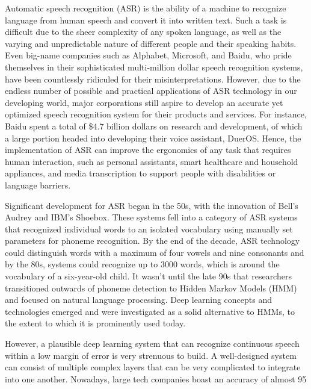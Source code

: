Automatic speech recognition (ASR) is the ability of a machine to recognize language from human speech and convert it into written text. Such a task is difficult due to the sheer complexity of any spoken language, as well as the varying and unpredictable nature of different people and their speaking habits. Even big-name companies such as Alphabet, Microsoft, and Baidu, who pride themselves in their sophisticated multi-million dollar speech recognition systems, have been countlessly ridiculed for their misinterpretations. However, due to the endless number of possible and practical applications of ASR technology in our developing world, major corporations still aspire to develop an accurate yet optimized speech recognition system for their products and services. For instance, Baidu spent a total of \$4.7 billion dollars on research and development, of which a large portion headed into developing their voice assistant, DuerOS. Hence, the implementation of ASR can improve the ergonomics of any task that requires human interaction, such as personal assistants, smart healthcare and household appliances, and media transcription to support people with disabilities or language barriers. 
\par
Significant development for ASR began in the 50s, with the innovation of Bell’s Audrey and IBM’s Shoebox. These systems fell into a category of ASR systems that recognized individual words to an isolated vocabulary using manually set parameters for phoneme recognition. By the end of the decade, ASR technology could distinguish words with a maximum of four vowels and nine consonants and by the 80s, systems could recognize up to 3000 words, which is around the vocabulary of a six-year-old child. It wasn’t until the late 90s that researchers transitioned outwards of phoneme detection to Hidden Markov Models (HMM) and focused on natural language processing. Deep learning concepts and technologies emerged and were investigated as a solid alternative to HMMs, to the extent to which it is prominently used today.
\par
However, a plausible deep learning system that can recognize continuous speech within a low margin of error is very strenuous to build. A well-designed system can consist of multiple complex layers that can be very complicated to integrate into one another. Nowadays, large tech companies boast an accuracy of almost 95%

